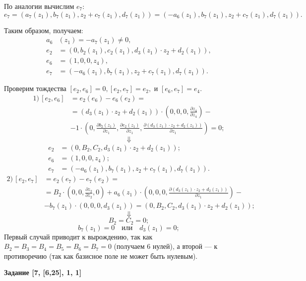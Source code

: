 \documentclass[12pt]{article}
\begin{document}
По аналогии вычислим $e_7$:
$$e_7 = (a_7(z_1), b_7(z_1), z_2 + c_7(z_1), d_7(z_1)) = (-a_6(z_1), b_7(z_1), z_2 + c_7(z_1), d_7(z_1)).$$ 

Таким образом, получаем:
\begin{align*}
a_6&(z_1) = -a_7(z_1) \neq 0, \\
e_2 &= (0, b_2(z_1), c_2(z_1), d_3(z_1) \cdot z_2 + d_2(z_1)), \\
e_6 &= (1, 0, 0, z_4), \\
e_7 &= (-a_6(z_1), b_7(z_1), z_2 + c_7(z_1), d_7(z_1)). 
\end{align*}

Проверим тождества $[e_2,e_6] = 0, [e_2,e_7] = e_2, \text{ и } [e_6,e_7] = e_4.$ 
\begin{align*}
1) \,
[e_2,e_6] &= e_2(e_6) - e_6(e_2) = \\
&= (d_3(z_1) \cdot z_2 + d_2(z_1)) \cdot \left(0, 0, 0, \frac{\partial z_4}{\partial z_4}\right) - \\
&- 1 \cdot \left(0, \frac{\partial b_2(z_1)}{\partial z_1}, \frac{\partial c_2(z_1)}{\partial z_1}, \frac{\partial (d_3(z_1) \cdot z_2 + d_2(z_1))}{\partial z_1}\right) = 0;
\end{align*}
$$\Downarrow$$
\begin{align*}
e_2 &= (0, B_2, C_2, d_3(z_1) \cdot z_2 + d_2(z_1)); \\ 
e_6 &= (1, 0, 0, z_4); \\ 
e_7 &= (-a_6(z_1), b_7(z_1), z_2 + c_7(z_1), d_7(z_1)). 
\end{align*}
\begin{align*}
2) \,
[e_2,e_7] &= e_2(e_7) - e_7(e_2) = \\
&= B_2 \cdot \left(0, 0, \frac{\partial z_2}{\partial z_2}, 0\right)
+ a_6(z_1) \cdot \left(0, 0, 0, \frac{\partial (d_3(z_1) \cdot z_2 + d_2(z_1))}{\partial z_1}\right) -\\
&- b_7(z_1) \cdot  (0,0,0,d_3(z_1)) = (0, B_2, C_2, d_3(z_1) \cdot z_2 + d_2(z_1));
\end{align*}
$$\Downarrow$$
$$B_2 = C_2 = 0;$$
$$b_7(z_1) = 0 \quad \text{или} \quad d_3(z_1) = 0;$$
Первый случай приводит к вырождению, так как $B_2 = B_3 = B_4 = B_5 = B_6 = B_7 = 0$ (получаем 6 нулей), а второй — к противоречию (так как базисное поле не может быть нулевым).\\

\begin{center}
\textbf{Задание [7, [6,25], 1, 1]}
\end{center}
\end{document}
